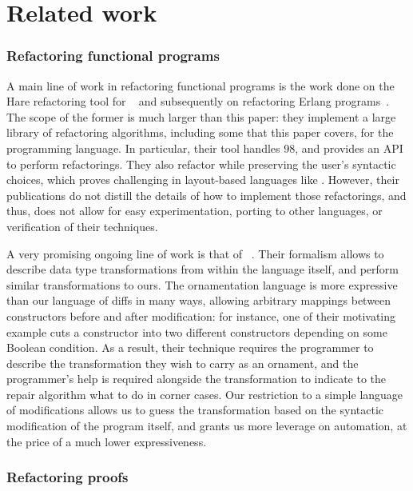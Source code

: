 \chapter{Related work}

\subsection*{Refactoring functional programs}

A main line of work in refactoring functional programs is the work done on the
Hare refactoring tool for \Haskell{}~\citep{li2005haskell} and subsequently on
refactoring Erlang programs~\citep{li2006}.  The scope of the former is much
larger than this paper: they implement a large library of refactoring
algorithms, including some that this paper covers, for the \Haskell{}
programming language.  In particular, their tool handles \Haskell{} 98, and
provides an API to perform refactorings.  They also refactor while preserving
the user's syntactic choices, which proves challenging in layout-based languages
like \Haskell{}.  However, their publications do not distill the details of how
to implement those refactorings, and thus, does not allow for easy
experimentation, porting to other languages, or verification of their
techniques.

A very promising ongoing line of work is that of
~\citep{williams2017}.  Their formalism allows to describe
data type transformations from within the language itself, and perform similar
transformations to ours.  The ornamentation language is more expressive than our
language of diffs in many ways, allowing arbitrary mappings between constructors
before and after modification: for instance, one of their motivating example
cuts a constructor into two different constructors depending on some Boolean
condition.  As a result, their technique requires the programmer to describe the
transformation they wish to carry as an ornament, and the programmer's help is
required alongside the transformation to indicate to the repair algorithm what
to do in corner cases.  Our restriction to a simple language of modifications
allows us to guess the transformation based on the syntactic modification of the
program itself, and grants us more leverage on automation, at the price of a
much lower expressiveness.

\subsection*{Refactoring proofs}

